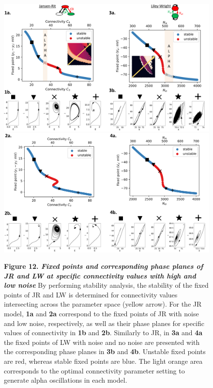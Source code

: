 \documentclass[12pt,twoside]{article}
\begin{document}
\begin{figure}[H]
    \hspace*{-2cm}
    \includegraphics[scale=0.49]{Images/Stability_noise_2.png}
    \hspace*{-0.3cm}
    \includegraphics[scale=0.49]{Images/Stability_low_noise_2.png}
    \caption*{\textbf{Figure 12.  \textit{Fixed points and corresponding phase planes of JR and LW at specific connectivity values with high and low noise}} By performing stability analysis, the stability of the fixed points of JR and LW is determined for connectivity values intersecting across the parameter space (yellow arrow). For the JR model, \textbf{1a} and \textbf{2a} correspond to the fixed points of JR with noise and low noise, respectively, as well as their phase planes for specific values of connectivity in \textbf{1b} and \textbf{2b}. Similarly to JR, in \textbf{3a} and \textbf{4a} the fixed points of LW with noise and no noise are presented with the corresponding phase planes in \textbf{3b} and \textbf{4b}. Unstable fixed points are red, whereas stable fixed points are blue. The light orange area corresponds to the optimal connectivity parameter setting to generate alpha oscillations in each model.} \label{fig:Fixed_points}
\end{figure}
\end{document}
